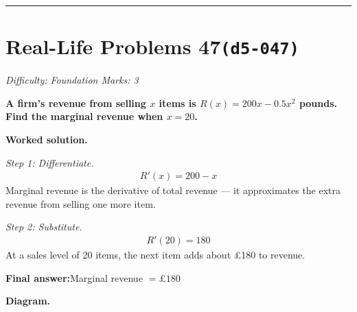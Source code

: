 \documentclass[11pt]{article}
\newcommand{\question}[1]{\par\medskip\noindent\textbf{#1}\par}
\begin{document}
\medskip\hrule

\section*{Real-Life Problems 47\quad\small\texttt{(d5-047)}}
\textit{Difficulty: Foundation \quad\textbar\quad Marks: 3}

\question{A firm's revenue from selling \( x \) items is \( R(x) = 200x - 0.5x^2 \) pounds. Find the marginal revenue when \( x = 20 \).}

\textbf{Worked solution.}

\textit{Step 1: Differentiate.}
\[\begin{gathered}
R'(x) = 200 - x
\end{gathered}\]
Marginal revenue is the derivative of total revenue --- it approximates the extra revenue from selling one more item.

\textit{Step 2: Substitute.}
\[\begin{gathered}
R'(20) = 180
\end{gathered}\]
At a sales level of 20 items, the next item adds about \pounds 180 to revenue.

\begin{answerbox}
\textbf{Final answer:}\quad Marginal revenue \(\displaystyle  = \pounds 180 \)
\end{answerbox}
\textbf{Diagram.}
\end{document}

